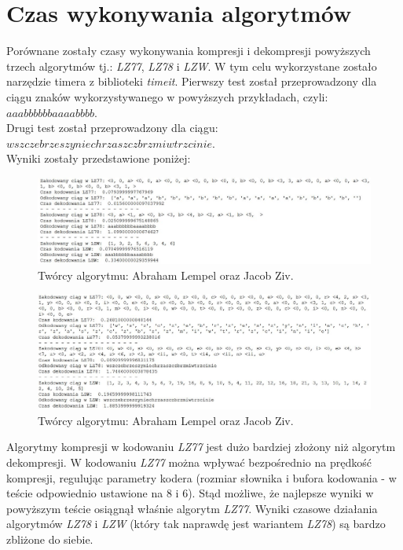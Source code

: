 \documentclass{article}
\begin{document}
\section{Czas wykonywania algorytmów}
Porównane zostały czasy wykonywania kompresji i dekompresji powyższych trzech algorytmów tj.: \textit{LZ77}, \textit{LZ78} i \textit{LZW}. W tym celu wykorzystane zostało narzędzie timera z biblioteki \textit{timeit}. Pierwszy test został przeprowadzony dla ciągu znaków wykorzystywanego w powyższych przykładach, czyli: $aaabbbbbbaaaabbbb$.\\ Drugi test został przeprowadzony dla ciągu:\\ $wszczebrzeszyniechrzaszczbrzmiwtrzcinie$.\\ Wyniki zostały przedstawione poniżej:
\setcounter{figure}{0}
\begin{figure}[h!]
\centering
\includegraphics[width=\textwidth]{img/time1.JPG}
\caption{Twórcy algorytmu: Abraham Lempel oraz Jacob Ziv.}
\end{figure}

\begin{figure}[h!]
\centering
\includegraphics[width=\textwidth]{img/time2.JPG}
\caption{Twórcy algorytmu: Abraham Lempel oraz Jacob Ziv.}
\end{figure}
\newpage

Algorytmy kompresji w kodowaniu \textit{LZ77} jest dużo bardziej złożony niż algorytm dekompresji. W kodowaniu \textit{LZ77} można wpływać bezpośrednio na prędkość kompresji, regulując parametry kodera (rozmiar słownika i bufora kodowania - w teście odpowiednio ustawione na 8 i 6). Stąd możliwe, że najlepsze wyniki w powyższym teście osiągnął właśnie algorytm \textit{LZ77}. Wyniki czasowe działania algorytmów \textit{LZ78} i \textit{LZW} (który tak naprawdę jest wariantem \textit{LZ78}) są bardzo zbliżone do siebie.
\end{document}
